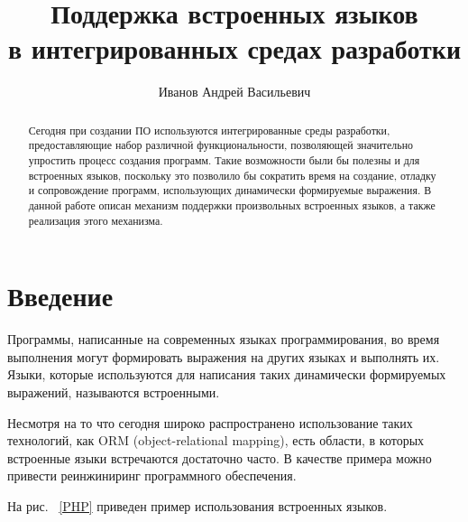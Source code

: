 \title{Поддержка встроенных языков \\ в интегрированных средах разработки}
%

\author{Иванов Андрей Васильевич}
%
%
%

\maketitle              %

\begin{abstract}
Сегодня при создании ПО используются интегрированные среды разработки, предоставляющие набор различной функциональности, позволяющей значительно упростить процесс создания программ. Такие возможности были бы полезны и для встроенных языков, поскольку это позволило бы сократить время на создание, отладку и сопровождение программ, использующих динамически формируемые выражения. В данной работе описан механизм поддержки произвольных встроенных языков, а также реализация этого механизма. 
\end{abstract}

\section*{Введение}

Программы, написанные на современных языках программирования, во время выполнения могут формировать 
выражения на других языках и выполнять их. Языки, которые используются для написания таких динамически 
формируемых выражений, называются встроенными. 

Несмотря на то что сегодня широко распространено использование таких технологий, как ORM (object-relational mapping), 
есть области, в которых встроенные языки встречаются достаточно часто. В качестве примера можно привести реинжиниринг 
программного обеспечения. 

На рис. ~\ref{PHP} приведен пример использования встроенных языков.

